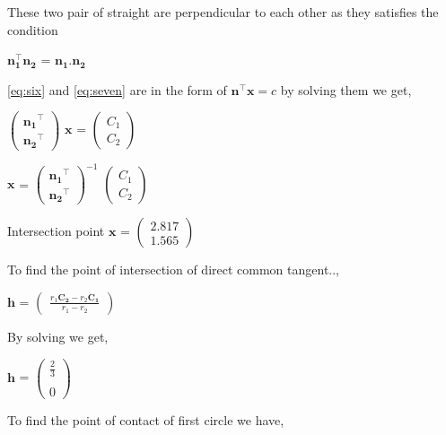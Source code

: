 \documentclass[journal,12pt,twocolumn]{IEEEtran}
\newcommand{\myvec}[1]{\ensuremath{\begin{pmatrix}#1\end{pmatrix}}}
\let\vec\mathbf
\begin{document}
These two pair of straight are perpendicular to each other as they satisfies the condition
\begin{center}
$\vec{n_1^{\top} n_2}$ = $\vec{n_1.n_2}$ \\
\end{center}

\eqref{eq:six} and \eqref{eq:seven} are in the form of $\vec{n^{\top}}\vec{x}=c$ by solving them we get,
\begin{center}
$\myvec{\vec{n_1}^{\top} \\ \vec{n_2}^{\top}}$ $\vec{x}$ = $\myvec{C_1 \\ C_2}$
\end{center} 

\begin{center}
$\vec{x}$ = $\myvec{\vec{n_1}^{\top} \\ \vec{n_2}^{\top}}^{-1}$ $\myvec{C_1 \\ C_2}$
\end{center}

\begin{center}
Intersection point $\vec{x}$ = $\myvec{2.817 \\ 1.565}$
\end{center}

To find the point of intersection of direct common tangent..,
\begin{center}
$\vec{h}$ =  $\myvec{\frac{r_1 \vec{C_2} - r_2 \vec{C_1}}{r_1 - r_2}}$
\end{center}

By solving we get,
\begin{center}
$\vec{h}$ = $\myvec{\frac{2}{3} \\ \\ 0}$ 
\end{center}

To find the point of contact of first circle we have,
\end{document}
